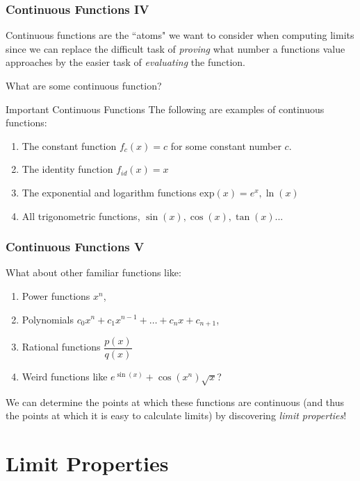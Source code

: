 \documentclass{ltx-talk}
\begin{document}
\begin{frame}
  \frametitle{Continuous Functions IV}

  Continuous functions are the ``atoms" we want to consider when computing limits \pause
  since we can replace the difficult task of \textit{proving} what number a functions value approaches \pause
  by the easier task of \textit{evaluating} the function. \pause

  What are some continuous function? \pause

  \begin{alertblock}{Important Continuous Functions}
    The following are examples of continuous functions: \pause
    \begin{enumerate}
      \item The constant function $f_c(x) = c$ for some constant number $c$. \pause
      \item The identity function $f_{id}(x) = x$ \pause
      \item The exponential and logarithm functions $\mathrm{exp}(x) = e^x, \ln(x)$ \pause
      \item All trigonometric functions, $\sin(x), \cos(x), \tan(x)...$ \pause
    \end{enumerate}
  \end{alertblock}
\end{frame}

\begin{frame}
  \frametitle{Continuous Functions V}
  What about other familiar functions like: \pause
  \begin{enumerate}
    \item Power functions $x^n$, \pause
    \item Polynomials $c_0x^n + c_1x^{n-1} + \ldots + c_n x + c_{n+1}$, \pause
    \item Rational functions $\dfrac{p(x)}{q(x)}$ \pause
    \item Weird functions like $e^{\sin(x)} + \cos(x^n)\sqrt{x}$?
  \end{enumerate}

  We can determine the points at which these functions are continuous \pause (and thus the points at which it is easy to calculate limits) \pause
  by discovering \textit{limit properties}!
\end{frame}

\section{Limit Properties}
\end{document}
